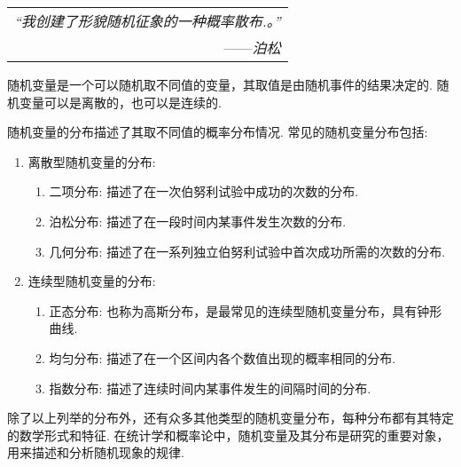 \begin{flushright}
    \begin{tabular}{r|||}
        \textit{“我创建了形貌随机征象的一种概率散布.。”}\\
        ——\textit{泊松}
    \end{tabular}
\end{flushright}

随机变量是一个可以随机取不同值的变量，其取值是由随机事件的结果决定的. 随机变量可以是离散的，也可以是连续的. 

随机变量的分布描述了其取不同值的概率分布情况. 常见的随机变量分布包括: 
\begin{enumerate}
    \item 离散型随机变量的分布: \begin{enumerate}
        \item 二项分布: 描述了在一次伯努利试验中成功的次数的分布. 
        \item 泊松分布: 描述了在一段时间内某事件发生次数的分布. 
        \item 几何分布: 描述了在一系列独立伯努利试验中首次成功所需的次数的分布. 
    \end{enumerate}
    \item 连续型随机变量的分布: \begin{enumerate}
        \item 正态分布: 也称为高斯分布，是最常见的连续型随机变量分布，具有钟形曲线. 
        \item 均匀分布: 描述了在一个区间内各个数值出现的概率相同的分布. 
        \item 指数分布: 描述了连续时间内某事件发生的间隔时间的分布. 
    \end{enumerate}
\end{enumerate}

除了以上列举的分布外，还有众多其他类型的随机变量分布，每种分布都有其特定的数学形式和特征. 在统计学和概率论中，随机变量及其分布是研究的重要对象，用来描述和分析随机现象的规律. 
